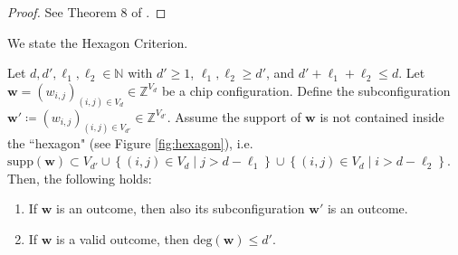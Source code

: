 \begin{proof}
    See Theorem 8 of \cite{grinberghyperfactorial}.
\end{proof}

We state the Hexagon Criterion.

\begin{proposition}\label{prop:hexagon-criterion231312}
    Let \( d, d', \ell_1, \ell_2 \in \mathbb{N} \) with \( d' \geq 1 \), \( \ell_1, \ell_2 \geq d' \), and \( d' + \ell_1 + \ell_2 \leq d \). Let \( \mathbf{w} = (w_{i,j})_{(i,j) \in V_d} \in \mathbb{Z}^{V_d} \) be a chip configuration. Define the subconfiguration \( \mathbf{w}' \coloneqq (w_{i,j})_{(i,j) \in V_{d'}} \in \mathbb{Z}^{V_{d'}}\). Assume the support of \( \mathbf{w} \) is not contained inside the ``hexagon" (see Figure \ref{fig:hexagon}), i.e. \( \mathrm{supp}(\mathbf{w}) \subset V_{d'}  \cup \left\{ (i,j) \in V_d \mid j > d - \ell_1 \right\} \cup \left\{ (i,j) \in V_d \mid i > d - \ell_2 \right\} \).
    Then, the following holds:
    \begin{enumerate}
        \item If \( \mathbf{w} \) is an outcome, then also its subconfiguration \( \mathbf{w}' \) is an outcome.
        \item If \( \mathbf{w} \) is a valid outcome, then \( \mathrm{deg}(\mathbf{w}) \leq d' \).
    \end{enumerate}
\end{proposition}

